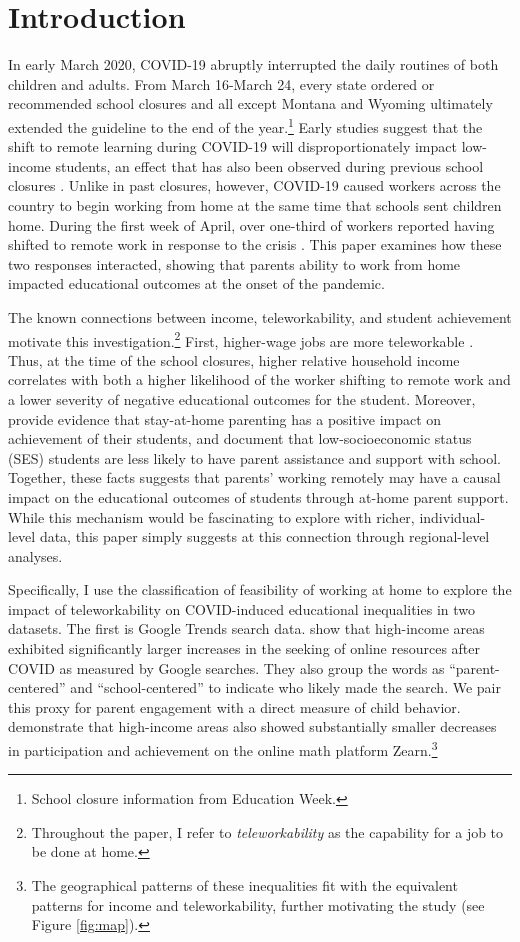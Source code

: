 \section{Introduction} \label{sec:introduction}
In early March 2020, COVID-19 abruptly interrupted the daily routines of both children and adults.
From March 16-March 24, every state ordered or recommended school closures and
all except Montana and Wyoming ultimately extended the guideline to the end of the
year.\footnote{School closure information from Education Week.}
Early studies suggest that the shift to remote learning during COVID-19 will disproportionately impact low-income students,
an effect that has also been observed during previous school closures
\citep{vonHippel, horowitz, jaeger, malkus}.
Unlike in past closures, however, COVID-19 caused workers across the country to begin working from home
at the same time that schools sent children home.
During the first week of April, over one-third of workers reported having shifted
to remote work in response to the crisis \citep{bynjolfsson}.
This paper examines how these two responses interacted, showing that parents
ability to work from home impacted educational outcomes at the onset of the pandemic.

The known connections between income, teleworkability, and student achievement motivate this investigation.\footnote{Throughout the paper, I refer to \textit{teleworkability} as the capability for a job to be done at home.}
First, higher-wage jobs are more teleworkable
\citep{bartik, dingel}.
Thus, at the time of the school closures, higher relative household income
correlates with both a higher likelihood of the worker shifting to remote work and a lower severity of negative educational outcomes for the student.
Moreover, \cite{bettinger} provide evidence that stay-at-home parenting has a positive impact on achievement of their students,
and \cite{sonnemann} document that low-socioeconomic status (SES) students are less likely to have parent assistance and support with school.
Together, these facts suggests that parents’ working remotely may have a causal impact on the educational outcomes of students through at-home parent support.
While this mechanism would be fascinating to explore with richer, individual-level data,
this paper simply suggests at this connection through regional-level analyses.

Specifically, I use the \cite{dingel} classification of feasibility of working at home to explore the impact of teleworkability on COVID-induced educational inequalities in two datasets.
The first is Google Trends search data.
\cite{bh1} show that high-income areas exhibited significantly larger
increases in the seeking of online resources after COVID as measured by Google searches.
They also group the words as ``parent-centered'' and ``school-centered'' to indicate who likely made the search.
We pair this proxy for parent engagement with a direct measure of child behavior.
\cite{chetty} demonstrate that high-income areas also showed substantially smaller decreases in participation and achievement on the online math platform Zearn.\footnote{The geographical patterns of these inequalities fit with the equivalent patterns for income and teleworkability, further motivating the study (see Figure \ref{fig:map}).}

